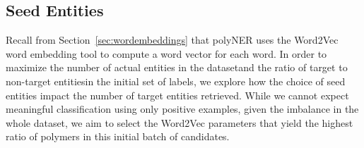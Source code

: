 \subsection{Seed Entities}\label{sec:wes}
Recall from Section~\ref{sec:wordembeddings} that polyNER uses the
Word2Vec word embedding tool to compute a word vector for each word.
In order to maximize the number of actual entities in the dataset\textemdash and the ratio of target to non-target entities\textemdash in the initial set of labels,
we explore how the choice of seed entities
impact the number of target entities retrieved.
While we cannot expect meaningful classification using only positive examples, 
given the imbalance in the whole dataset, we aim to select the Word2Vec parameters that yield the highest ratio of polymers in this initial batch of candidates.


